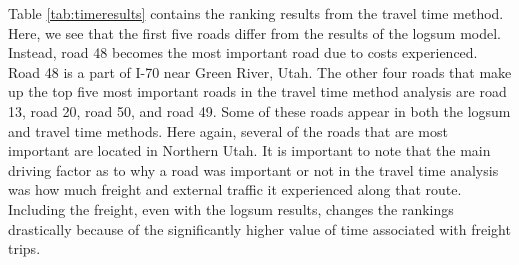 Table \ref{tab:timeresults} contains the ranking results from the travel
time method. Here, we see that the first five roads differ from the
results of the logsum model. Instead, road 48 becomes the most important
road due to costs experienced. Road 48 is a part of I-70 near Green River,
Utah. The other four roads that make up the top five most important roads
in the travel time method analysis are road 13, road 20, road 50, and road
49. Some of these roads appear in both the logsum and travel time methods.
Here again, several of the roads that are most important are located in
Northern Utah. It is important to note that the main driving factor as to
why a road was important or not in the travel time analysis was how much
freight and external traffic it experienced along that route. Including
the freight, even with the logsum results, changes the rankings
drastically because of the significantly higher value of time associated
with freight trips.

